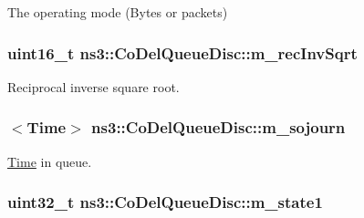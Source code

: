 The operating mode (Bytes or packets) 

\subsubsection[{\texorpdfstring{m\+\_\+rec\+Inv\+Sqrt}{m_recInvSqrt}}]{\setlength{\rightskip}{0pt plus 5cm}uint16\+\_\+t ns3\+::\+Co\+Del\+Queue\+Disc\+::m\+\_\+rec\+Inv\+Sqrt\hspace{0.3cm}{\ttfamily [private]}}\hypertarget{classns3_1_1CoDelQueueDisc_a348cfedf39aedbc10137a50c991df6fa}{}\label{classns3_1_1CoDelQueueDisc_a348cfedf39aedbc10137a50c991df6fa}


Reciprocal inverse square root. 

\subsubsection[{\texorpdfstring{m\+\_\+sojourn}{m_sojourn}}]{$<${\bf Time}$>$ ns3\+::\+Co\+Del\+Queue\+Disc\+::m\+\_\+sojourn\hspace{0.3cm}{\ttfamily [private]}}\hypertarget{classns3_1_1CoDelQueueDisc_a13049e1c243e1467bd1637cf203c60cb}{}\label{classns3_1_1CoDelQueueDisc_a13049e1c243e1467bd1637cf203c60cb}


\hyperlink{classns3_1_1Time}{Time} in queue. 

\subsubsection[{\texorpdfstring{m\+\_\+state1}{m_state1}}]{\setlength{\rightskip}{0pt plus 5cm}uint32\+\_\+t ns3\+::\+Co\+Del\+Queue\+Disc\+::m\+\_\+state1\hspace{0.3cm}{\ttfamily [private]}}\hypertarget{classns3_1_1CoDelQueueDisc_a2f305bba337e0ec5c7ba23ced30737bb}{}\label{classns3_1_1CoDelQueueDisc_a2f305bba337e0ec5c7ba23ced30737bb}


